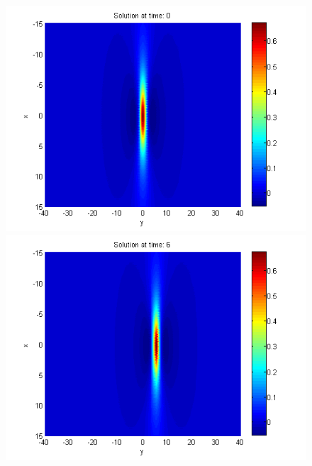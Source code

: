 \documentclass{article}
\begin{document}
\begin{figure}[ht]\vspace{0.2cm}
\centering
	\begin{minipage}[b]{0.30\linewidth}
		\includegraphics[width=\linewidth]{../amitans/figures/solution_128x90_bt1_c090_T0.png}
	\end{minipage}	
	\begin{minipage}[b]{0.30\linewidth}
		\includegraphics[width=\linewidth]{../amitans/figures/solution_128x90_bt1_c090_T6.png}
	\end{minipage}	
	\begin{minipage}[b]{0.30\linewidth}

\end{minipage}
\end{figure}
\end{document}
